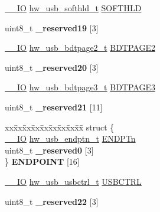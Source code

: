 \begin{DoxyCompactItemize}
\item 
\hyperlink{core__sc300_8h_aec43007d9998a0a0e01faede4133d6be}{\+\_\+\+\_\+\+IO} \hyperlink{union__hw__usb__softhld}{hw\+\_\+usb\+\_\+softhld\+\_\+t} \hyperlink{struct__hw__usb_a75f453a65e5c69e71b5d7e8b556f3201}{S\+O\+F\+T\+H\+LD}
\item 
uint8\+\_\+t {\bfseries \+\_\+reserved19} \mbox{[}3\mbox{]}\hypertarget{struct__hw__usb_af566e2d085b7c6850961c084f595a873}{}\label{struct__hw__usb_af566e2d085b7c6850961c084f595a873}

\item 
\hyperlink{core__sc300_8h_aec43007d9998a0a0e01faede4133d6be}{\+\_\+\+\_\+\+IO} \hyperlink{union__hw__usb__bdtpage2}{hw\+\_\+usb\+\_\+bdtpage2\+\_\+t} \hyperlink{struct__hw__usb_a8f43cef59933587fddbea909cf761524}{B\+D\+T\+P\+A\+G\+E2}
\item 
uint8\+\_\+t {\bfseries \+\_\+reserved20} \mbox{[}3\mbox{]}\hypertarget{struct__hw__usb_aefbd8b5181d58e3f8704bbbdcdeb6f9c}{}\label{struct__hw__usb_aefbd8b5181d58e3f8704bbbdcdeb6f9c}

\item 
\hyperlink{core__sc300_8h_aec43007d9998a0a0e01faede4133d6be}{\+\_\+\+\_\+\+IO} \hyperlink{union__hw__usb__bdtpage3}{hw\+\_\+usb\+\_\+bdtpage3\+\_\+t} \hyperlink{struct__hw__usb_a0f4521f07da0227cc026a2f35a789dea}{B\+D\+T\+P\+A\+G\+E3}
\item 
uint8\+\_\+t {\bfseries \+\_\+reserved21} \mbox{[}11\mbox{]}\hypertarget{struct__hw__usb_ad9aa354808af233be6a108ce77bd75db}{}\label{struct__hw__usb_ad9aa354808af233be6a108ce77bd75db}

\item 
\begin{tabbing}
xx\=xx\=xx\=xx\=xx\=xx\=xx\=xx\=xx\=\kill
struct \{\\
\>\hyperlink{core__sc300_8h_aec43007d9998a0a0e01faede4133d6be}{\_\_IO} \hyperlink{union__hw__usb__endptn}{hw\_usb\_endptn\_t} \hyperlink{struct__hw__usb_a1742e9e070408dcd32e7f957604a4bdc}{ENDPTn}\\
\>uint8\_t {\bfseries \_reserved0} \mbox{[}3\mbox{]}\\
\} {\bfseries ENDPOINT} \mbox{[}16\mbox{]}\hypertarget{struct__hw__usb_a331d5d8d0ea1fc17e1a6dc547882a82c}{}\label{struct__hw__usb_a331d5d8d0ea1fc17e1a6dc547882a82c}
\\

\end{tabbing}\item 
\hyperlink{core__sc300_8h_aec43007d9998a0a0e01faede4133d6be}{\+\_\+\+\_\+\+IO} \hyperlink{union__hw__usb__usbctrl}{hw\+\_\+usb\+\_\+usbctrl\+\_\+t} \hyperlink{struct__hw__usb_ae2ecf4e8c66c92d022914f0ffa21e395}{U\+S\+B\+C\+T\+RL}
\item 
uint8\+\_\+t {\bfseries \+\_\+reserved22} \mbox{[}3\mbox{]}\hypertarget{struct__hw__usb_ae560f41183c3e8031181d359b0045ede}{}\label{struct__hw__usb_ae560f41183c3e8031181d359b0045ede}


\end{DoxyCompactItemize}
